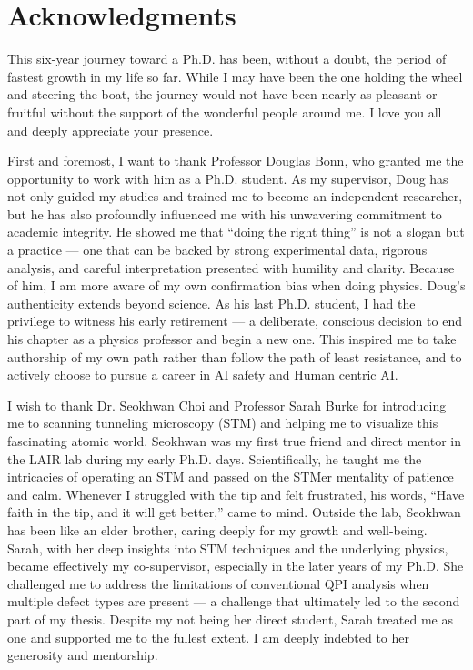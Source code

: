
\chapter{Acknowledgments}
This six-year journey toward a Ph.D. has been, without a doubt, the period of fastest growth in my life so far. While I may have been the one holding the wheel and steering the boat, the journey would not have been nearly as pleasant or fruitful without the support of the wonderful people around me. I love you all and deeply appreciate your presence.

First and foremost, I want to thank Professor Douglas Bonn, who granted me the opportunity to work with him as a Ph.D. student. As my supervisor, Doug has not only guided my studies and trained me to become an independent researcher, but he has also profoundly influenced me with his unwavering commitment to academic integrity. He showed me that “doing the right thing” is not a slogan but a practice — one that can be backed by strong experimental data, rigorous analysis, and careful interpretation presented with humility and clarity. Because of him, I am more aware of my own confirmation bias when doing physics. Doug’s authenticity extends beyond science. As his last Ph.D. student, I had the privilege to witness his early retirement — a deliberate, conscious decision to end his chapter as a physics professor and begin a new one. This inspired me to take authorship of my own path rather than follow the path of least resistance, and to actively choose to pursue a career in AI safety and Human centric AI.

I wish to thank Dr. Seokhwan Choi and Professor Sarah Burke for introducing me to scanning tunneling microscopy (STM) and helping me to visualize this fascinating atomic world. Seokhwan was my first true friend and direct mentor in the LAIR lab during my early Ph.D. days. Scientifically, he taught me the intricacies of operating an STM and passed on the STMer mentality of patience and calm. Whenever I struggled with the tip and felt frustrated, his words, “Have faith in the tip, and it will get better,” came to mind. Outside the lab, Seokhwan has been like an elder brother, caring deeply for my growth and well-being. Sarah, with her deep insights into STM techniques and the underlying physics, became effectively my co-supervisor, especially in the later years of my Ph.D. She challenged me to address the limitations of conventional QPI analysis when multiple defect types are present — a challenge that ultimately led to the second part of my thesis. Despite my not being her direct student, Sarah treated me as one and supported me to the fullest extent. I am deeply indebted to her generosity and mentorship.

